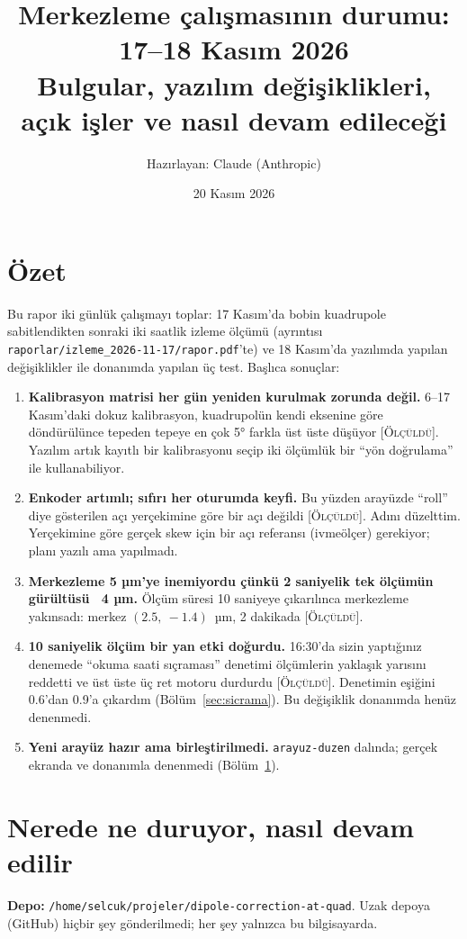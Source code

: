 \documentclass[11pt,a4paper]{article}
\title{Merkezleme çalışmasının durumu: 17--18 Kasım 2026\\[0.3em]
\large Bulgular, yazılım değişiklikleri, açık işler ve nasıl devam edileceği}
\author{Hazırlayan: Claude (Anthropic)}
\date{20 Kasım 2026}
\newcommand{\kod}[1]{\texttt{#1}}
\newcommand{\olc}{\textsc{[Ölçüldü]}}
\begin{document}
\maketitle

\section*{Özet}

Bu rapor iki günlük çalışmayı toplar: 17 Kasım'da bobin kuadrupole sabitlendikten sonraki iki saatlik izleme
ölçümü (ayrıntısı \kod{raporlar/izleme\_2026-11-17/rapor.pdf}'te) ve 18 Kasım'da yazılımda yapılan değişiklikler
ile donanımda yapılan üç test. Başlıca sonuçlar:

\begin{enumerate}
\item \textbf{Kalibrasyon matrisi her gün yeniden kurulmak zorunda değil.} 6--17 Kasım'daki dokuz kalibrasyon,
kuadrupolün kendi eksenine göre döndürülünce tepeden tepeye en çok 5° farkla üst üste düşüyor \olc. Yazılım artık
kayıtlı bir kalibrasyonu seçip iki ölçümlük bir ``yön doğrulama'' ile kullanabiliyor.
\item \textbf{Enkoder artımlı; sıfırı her oturumda keyfi.} Bu yüzden arayüzde ``roll'' diye gösterilen açı
yerçekimine göre bir açı değildi \olc. Adını düzelttim. Yerçekimine göre gerçek skew için bir açı referansı
(ivmeölçer) gerekiyor; planı yazılı ama yapılmadı.
\item \textbf{Merkezleme 5 µm'ye inemiyordu çünkü 2 saniyelik tek ölçümün gürültüsü ~4 µm.} Ölçüm süresi 10
saniyeye çıkarılınca merkezleme yakınsadı: merkez $(2.5,\ -1.4)$~µm, 2 dakikada \olc.
\item \textbf{10 saniyelik ölçüm bir yan etki doğurdu.} 16:30'da sizin yaptığınız denemede ``okuma saati
sıçraması'' denetimi ölçümlerin yaklaşık yarısını reddetti ve üst üste üç ret motoru durdurdu \olc. Denetimin
eşiğini 0.6'dan 0.9'a çıkardım (Bölüm~\ref{sec:sicrama}). Bu değişiklik donanımda henüz denenmedi.
\item \textbf{Yeni arayüz hazır ama birleştirilmedi.} \kod{arayuz-duzen} dalında; gerçek ekranda ve donanımla
denenmedi (Bölüm~\ref{sec:durum}).
\end{enumerate}

\section{Nerede ne duruyor, nasıl devam edilir}
\label{sec:durum}

\textbf{Depo:} \kod{/home/selcuk/projeler/dipole-correction-at-quad}. Uzak depoya (GitHub) hiçbir şey
gönderilmedi; her şey yalnızca bu bilgisayarda.
\end{document}

